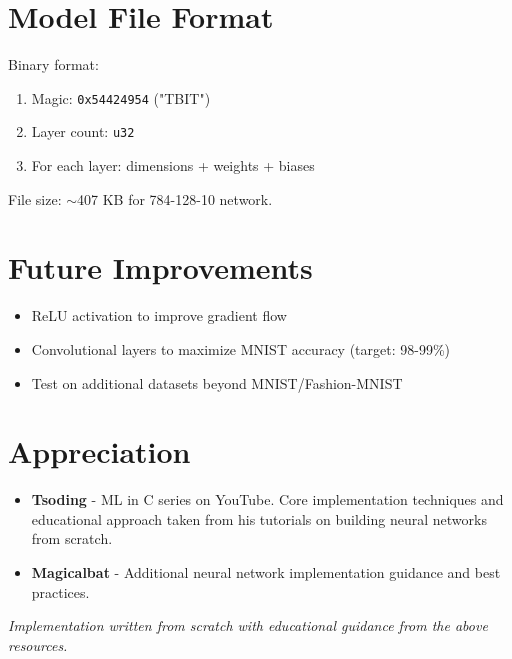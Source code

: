 \documentclass[11pt,a4paper]{article}
\begin{document}
\section{Model File Format}

Binary format:
\begin{enumerate}
    \item Magic: \texttt{0x54424954} ("TBIT")
    \item Layer count: \texttt{u32}
    \item For each layer: dimensions + weights + biases
\end{enumerate}

File size: $\sim$407 KB for 784-128-10 network.

\section{Future Improvements}

\begin{itemize}
    \item[$\square$] ReLU activation to improve gradient flow
    \item[$\square$] Convolutional layers to maximize MNIST accuracy (target: 98-99\%)
    \item[$\square$] Test on additional datasets beyond MNIST/Fashion-MNIST
\end{itemize}

\section{Appreciation}

\begin{itemize}
    \item \textbf{Tsoding} - ML in C series on YouTube. Core implementation techniques and educational approach taken from his tutorials on building neural networks from scratch.
    \item \textbf{Magicalbat} - Additional neural network implementation guidance and best practices.
\end{itemize}

\textit{Implementation written from scratch with educational guidance from the above resources.}
\end{document}
